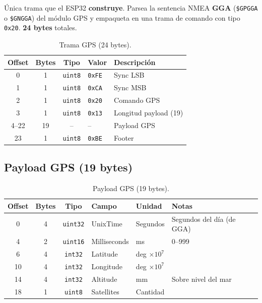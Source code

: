 \documentclass[11pt,a4paper]{article}
\begin{document}
Única trama que el ESP32 \textbf{construye}. Parsea la sentencia NMEA \textbf{GGA} (\texttt{\$GPGGA} o \texttt{\$GNGGA}) del módulo GPS y empaqueta en una trama de comando con tipo \texttt{0x20}. \textbf{24 bytes} totales.

\begin{table}[h]
\centering
\begin{tabular}{@{}cccll@{}}
\toprule
\textbf{Offset} & \textbf{Bytes} & \textbf{Tipo} & \textbf{Valor} & \textbf{Descripción} \\
\midrule
0  & 1 & \texttt{uint8} & \texttt{0xFE}  & Sync LSB \\
1  & 1 & \texttt{uint8} & \texttt{0xCA}  & Sync MSB \\
2  & 1 & \texttt{uint8} & \texttt{0x20}  & Comando GPS \\
3  & 1 & \texttt{uint8} & \texttt{0x13}  & Longitud payload (19) \\
4--22 & 19 & --         & --            & Payload GPS \\
23 & 1 & \texttt{uint8} & \texttt{0xBE}  & Footer \\
\bottomrule
\end{tabular}
\caption{Trama GPS (24 bytes).}
\end{table}

\subsection{Payload GPS (19 bytes)}

\begin{table}[h]
\centering
\begin{tabular}{@{}ccclll@{}}
\toprule
\textbf{Offset} & \textbf{Bytes} & \textbf{Tipo} & \textbf{Campo} & \textbf{Unidad} & \textbf{Notas} \\
\midrule
0  & 4 & \texttt{uint32} & UnixTime     & Segundos      & Segundos del día (de GGA) \\
4  & 2 & \texttt{uint16} & Milliseconds & ms            & 0--999 \\
6  & 4 & \texttt{int32}  & Latitude     & deg $\times 10^7$ & \\
10 & 4 & \texttt{int32}  & Longitude    & deg $\times 10^7$ & \\
14 & 4 & \texttt{int32}  & Altitude     & mm            & Sobre nivel del mar \\
18 & 1 & \texttt{uint8}  & Satellites   & Cantidad      & \\
\bottomrule
\end{tabular}
\caption{Payload GPS (19 bytes).}
\end{table}
\end{document}
